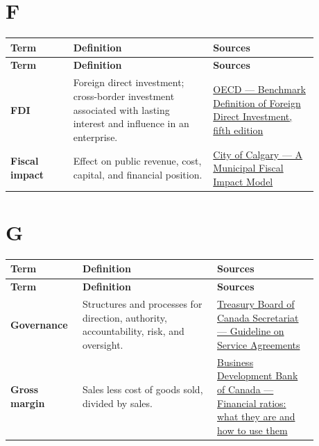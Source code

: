 \documentclass[11pt,letterpaper,oneside,openany]{book}
\begin{document}
\section[F]{F}
\begin{center}
\small
\setlength{\LTpre}{0.4em}
\setlength{\LTpost}{0.8em}
\begin{longtable}{>{\RaggedRight\arraybackslash}p{0.180\linewidth}>{\RaggedRight\arraybackslash}p{0.400\linewidth}>{\RaggedRight\arraybackslash}p{0.300\linewidth}}
\rowcolor{DeepNavy}
\color{white}\bfseries Term & \color{white}\bfseries Definition & \color{white}\bfseries Sources \\
\endfirsthead
\rowcolor{DeepNavy}
\color{white}\bfseries Term & \color{white}\bfseries Definition & \color{white}\bfseries Sources \\
\endhead
\textbf{FDI} & Foreign direct investment; cross-border investment associated with lasting interest and influence in an enterprise. & \href{https://www.oecd.org/en/publications/oecd-benchmark-definition-of-foreign-direct-investment-fifth-edition\_7f05c0a3-en/full-report/main-concepts-and-definitions-of-foreign-direct-investment\_c3240e7d.html}{OECD --- Benchmark Definition of Foreign Direct Investment, fifth edition} \\
\textbf{Fiscal impact} & Effect on public revenue, cost, capital, and financial position. & \href{https://www.calgary.ca/content/dam/www/cfod/finance/documents/corporate-economics/other-reports/municipal-fiscal-impact-model.pdf}{City of Calgary --- A Municipal Fiscal Impact Model} \\
\end{longtable}
\end{center}
\section[G]{G}
\begin{center}
\small
\setlength{\LTpre}{0.4em}
\setlength{\LTpost}{0.8em}
\begin{longtable}{>{\RaggedRight\arraybackslash}p{0.180\linewidth}>{\RaggedRight\arraybackslash}p{0.400\linewidth}>{\RaggedRight\arraybackslash}p{0.300\linewidth}}
\rowcolor{DeepNavy}
\color{white}\bfseries Term & \color{white}\bfseries Definition & \color{white}\bfseries Sources \\
\endfirsthead
\rowcolor{DeepNavy}
\color{white}\bfseries Term & \color{white}\bfseries Definition & \color{white}\bfseries Sources \\
\endhead
\textbf{Governance} & Structures and processes for direction, authority, accountability, risk, and oversight. & \href{https://www.tbs-sct.canada.ca/pol/doc-eng.aspx?id=25761}{Treasury Board of Canada Secretariat --- Guideline on Service Agreements} \\
\textbf{Gross margin} & Sales less cost of goods sold, divided by sales. & \href{https://www.bdc.ca/en/articles-tools/money-finance/manage-finances/financial-ratios-what-are-how-use}{Business Development Bank of Canada --- Financial ratios: what they are and how to use them} \\
\end{longtable}
\end{center}
\end{document}
